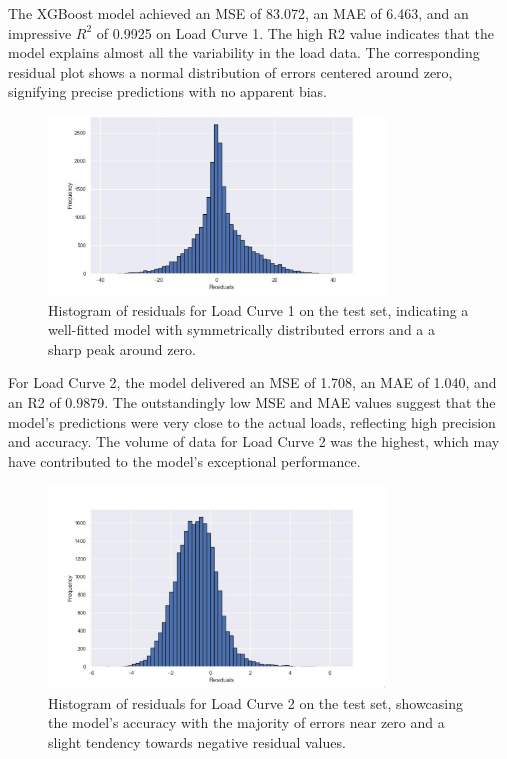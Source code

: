 \documentclass{article} %
\begin{document}
The XGBoost model achieved an \gls{MSE} of 83.072, an \gls{MAE} of 6.463, and an impressive $R^2$ of 0.9925 on Load Curve 1. The high \gls{R2} value indicates that the model explains almost all the variability in the load data. The corresponding residual plot shows a normal distribution of errors centered around zero, signifying precise predictions with no apparent bias.
\begin{figure}[H]
\centering
\includegraphics[width=0.8\textwidth]{ressources/residuals/erg/lc1/residuals.jpeg}
\caption{Histogram of residuals for Load Curve 1 on the test set, indicating a well-fitted model with symmetrically distributed errors and a a sharp peak around zero.}
\label{fig:residuals_curve1}
\end{figure}

For Load Curve 2, the model delivered an \gls{MSE} of 1.708, an \gls{MAE} of 1.040, and an \gls{R2} of 0.9879. The outstandingly low \gls{MSE} and \gls{MAE} values suggest that the model's predictions were very close to the actual loads, reflecting high precision and accuracy. The volume of data for Load Curve 2 was the highest, which may have contributed to the model's exceptional performance.
\begin{figure}[H]
\centering
\includegraphics[width=0.8\textwidth]{ressources/residuals/erg/lc2/residuals.jpg}
\caption{Histogram of residuals for Load Curve 2 on the test set, showcasing the model's accuracy with the majority of errors near zero and a slight tendency towards negative residual values.}
\label{fig:residuals_curve2}
\end{figure}
\end{document}
